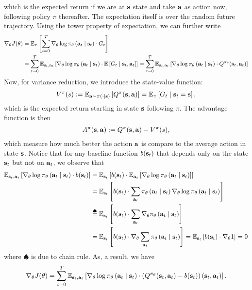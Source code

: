 \documentclass[11pt]{article}  %
\begin{document}
which is the expected return if we are at $\mathbf{s}$ state and take $\mathbf{a}$ as action now, following policy $\pi$ thereafter.
The expectation itself is over the random future trajectory.
Using the tower property of expectation, we can further write 
\begin{align*}
  \nabla_{\theta} J(\theta) &= \mathbb{E}_{\tau}\left[\sum_{t=0}^{T}\nabla_\theta \log \pi_{\theta}\left( \mathbf{a}_t \mid \mathbf{s}_t \right) \cdot G_t\right]\\
  &= \sum_{t=0}^{T}\mathbb{E}_{\mathbf{s}_t, \mathbf{a}_t}\left[\nabla_{\theta} \log\pi_{\theta}\left( \mathbf{a}_t \mid \mathbf{s}_t \right)\cdot\mathbb{E}\left[G_t \mid \mathbf{s}_t, \mathbf{a}_t\right]\right] =  \sum_{t=0}^{T}\mathbb{E}_{\mathbf{s}_t, \mathbf{a}_t}\left[\nabla_{\theta} \log\pi_{\theta}\left( \mathbf{a}_t \mid \mathbf{s}_t \right)\cdot Q^{\pi_\theta}(\mathbf{s}_t, \mathbf{a}_t)\right]
\end{align*}
Now, for variance reduction, we introduce the state-value function:
\begin{align*}
  V^{\pi}(s) := \mathbb{E}_{\mathbf{a} \sim \pi_{}\left( \cdot \mid \mathbf{s} \right)}\left[Q^{\pi}(\mathbf{s}, \mathbf{a})\right] = \mathbb{E}_{\pi}\left[G_t \mid \mathbf{s}_t = \mathbf{s}\right],
\end{align*}
which is the expected return starting in state $\mathbf{s}$ following $\pi$.
The advantage function is then 
\begin{align*}
  A^{\pi}(\mathbf{s}, \mathbf{a}) := Q^{\pi}(\mathbf{s}, \mathbf{a}) - V^{\pi}(s),
\end{align*}
which measure how much better the action $\mathbf{a}$ is compare to the average action in state $\mathbf{s}$.
Notice that for any baseline function $b(\mathbf{s}_t)$ that depends only on the state $\mathbf{s}_t$ but not on $\mathbf{a}_t$, we observe that 
\begin{align*}
  \mathbb{E}_{\mathbf{s}_t, \mathbf{a}_t}\left[\nabla_\theta \log \pi_{\theta}\left( \mathbf{a}_t \mid \mathbf{s}_t \right) \cdot b(\mathbf{s}_t)\right] &= \mathbb{E}_{\mathbf{s}_t}\left[b(\mathbf{s}_t) \cdot \mathbb{E}_{\mathbf{a}_t}\left[\nabla_\theta \log \pi_{\theta}\left( \mathbf{a}_t \mid \mathbf{s}_t \right)\right]\right] \\
  &= \mathbb{E}_{\mathbf{s}_t}\left[b(\mathbf{s}_t) \cdot \sum_{\mathbf{a}_t}\pi_{\theta}\left( \mathbf{a}_t \mid \mathbf{s}_t \right)\nabla_\theta \log \pi_{\theta}\left( \mathbf{a}_t \mid \mathbf{s}_t \right)\right] \\
  &\overset{\spadesuit}{=} \mathbb{E}_{\mathbf{s}_t}\left[b(\mathbf{s}_t) \cdot \sum_{\mathbf{a}_t}\nabla_\theta \pi_{\theta}\left( \mathbf{a}_t \mid \mathbf{s}_t \right)\right] \\
  &= \mathbb{E}_{\mathbf{s}_t}\left[b(\mathbf{s}_t) \cdot \nabla_\theta \sum_{\mathbf{a}_t} \pi_{\theta}\left( \mathbf{a}_t \mid \mathbf{s}_t \right)\right] = \mathbb{E}_{\mathbf{s}_t}\left[b(\mathbf{s}_t) \cdot \nabla_\theta 1\right] = 0
\end{align*} 
where $\spadesuit$ is due to chain rule.
As, a result, we have 
\begin{align*}
  \nabla_{\theta} J(\theta) = \sum_{t=0}^{T}\mathbb{E}_{\mathbf{s}_t, \mathbf{a}_t}\left[\nabla_{\theta}\log \pi_{\theta}\left( \mathbf{a}_t \mid \mathbf{s}_t \right)\cdot \left( Q^{\pi_\theta}(\mathbf{s}_t, \mathbf{a}_t) - b(\mathbf{s}_t) \right)(\mathbf{s}_t, \mathbf{a}_t)\right].
\end{align*} 
\end{document}
